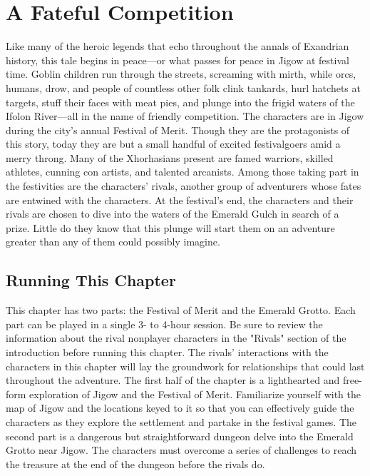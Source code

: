 \documentclass[10pt,a4,twoside,twocolumn,openany,nodeprecatedcode]{dndbook}
\begin{document}
\chapter{A Fateful Competition}
Like many of the heroic legends that echo throughout the annals of Exandrian history, this tale begins in peace—or what passes for peace in Jigow at festival time. Goblin children run through the streets, screaming with mirth, while orcs, humans, drow, and people of countless other folk clink tankards, hurl hatchets at targets, stuff their faces with meat pies, and plunge into the frigid waters of the Ifolon River—all in the name of friendly competition.
The characters are in Jigow during the city's annual Festival of Merit. Though they are the protagonists of this story, today they are but a small handful of excited festivalgoers amid a merry throng. Many of the Xhorhasians present are famed warriors, skilled athletes, cunning con artists, and talented arcanists. Among those taking part in the festivities are the characters' rivals, another group of adventurers whose fates are entwined with the characters.
At the festival's end, the characters and their rivals are chosen to dive into the waters of the Emerald Gulch in search of a prize. Little do they know that this plunge will start them on an adventure greater than any of them could possibly imagine.
\section{Running This Chapter}
This chapter has two parts: the Festival of Merit and the Emerald Grotto. Each part can be played in a single 3- to 4-hour session. Be sure to review the information about the rival nonplayer characters in the "Rivals" section of the introduction before running this chapter. The rivals' interactions with the characters in this chapter will lay the groundwork for relationships that could last throughout the adventure.
The first half of the chapter is a lighthearted and free-form exploration of Jigow and the Festival of Merit. Familiarize yourself with the map of Jigow and the locations keyed to it so that you can effectively guide the characters as they explore the settlement and partake in the festival games.
The second part is a dangerous but straightforward dungeon delve into the Emerald Grotto near Jigow. The characters must overcome a series of challenges to reach the treasure at the end of the dungeon before the rivals do.
\end{document}
